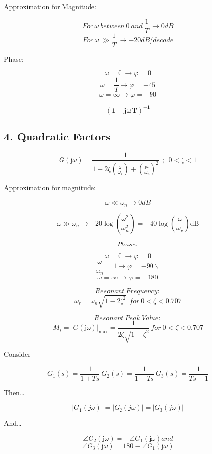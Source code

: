 \begin{multicols}{3}
Approximation for Magnitude:

\[For\ \omega\ between\ 0\ and\ \frac{1}{T}\  \rightarrow 0dB\]
\[For\ \omega\  \gg \frac{1}{T} \  \rightarrow - 20dB/decade\]

Phase:

\[\omega = 0\  \rightarrow \varphi = 0\]
\[\omega = \frac{1}{T} \rightarrow \varphi = - 45\]
\[\omega = \infty \rightarrow \varphi = - 90 \]

\[\left( \mathbf{1 + j\omega T} \right)^{\mathbf{+ 1}}\]

\subsection{4. Quadratic Factors}

\[G\left( \text{j}\omega \right) = \frac{1}{1 + 2\zeta\left( \frac{\omega}{\omega_{n}} \right) + \left( \frac{\text{j}\omega}{\omega_{n}} \right)^{2}}\ \ ;\ \ 0 < \zeta < 1\]

Approximation for magnitude:

\[\omega \ll \omega_{n} \rightarrow 0dB\]

\[\omega \gg \omega_{n} \rightarrow - 20\log\left( \frac{\omega^{2}}{\omega_{n}^{2}} \right) = - 40\log{\left( \frac{\omega}{\omega_{n}} \right)\text{dB}}\]

\[Phase:\]

\[\omega = 0\  \rightarrow \varphi = 0\]
\[\frac{\omega}{\omega_{n}} = 1 \rightarrow \varphi = - 90\backslash \]
\[\omega = \infty \rightarrow \varphi = - 180 \]

\[Resonant\ Frequency:\]
	\[\omega_{r} = \omega_{n}\sqrt{1 - 2\zeta^{2}}\ \ for\ 0 < \zeta < 0.707\]

\[Resonant\ Peak\ Value:\]
\[M_{r} = \left| G\left( \text{j}\omega \right) \right|_{\max} = \frac{1}{2\zeta\sqrt{1 - \zeta^{2}}} \ for\ 0 < \zeta < 0.707 \]

Consider

\[ G_{1}\left( s \right) = \frac{1}{1 + Ts} \ G_{2}\left( s \right) = \frac{1}{1 - Ts} \ G_{3}\left( s \right) = \frac{1}{Ts - 1} \]

Then\ldots{}

\[\left| G_{1}(j\omega) \right| = \left| G_{2}(j\omega) \right| = \left| G_{3}(j\omega) \right|\]

And\ldots{}

\[\angle G_{2}\left( \text{j}\omega \right) = - \angle G_{1}\left( \text{j}\omega \right) and \]
\[ \angle G_{3}\left( \text{j}\omega \right) = 180 - \angle G_{1}\left( \text{j}\omega \right)\]


\end{multicols}
